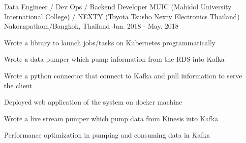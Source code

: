 \begin{cventries}
  \cventry
    {Data Engineer / Dev Ops / Backend Developer} %
    {MUIC (Mahidol University International College) / NEXTY (Toyota Tsusho Nexty Electronics Thailand)} %
    {Nakornpathom/Bangkok, Thailand} %
    {Jan. 2018 - May. 2018} %
    {
      \begin{cvitems} %
        \item {Wrote a library to launch jobs/tasks on Kubernetes programmatically}
        \item {Wrote a data pumper which pump information from the RDS into Kafka}
        \item {Wrote a python connector that connect to Kafka and pull information to serve the client}
        \item {Deployed web application of the system on docker machine}
        \item {Wrote a live stream pumper which pump data from Kinesis into Kafka}
        \item {Performance optimization in pumping and consuming data in Kafka}
      \end{cvitems}
    }


\end{cventries}
